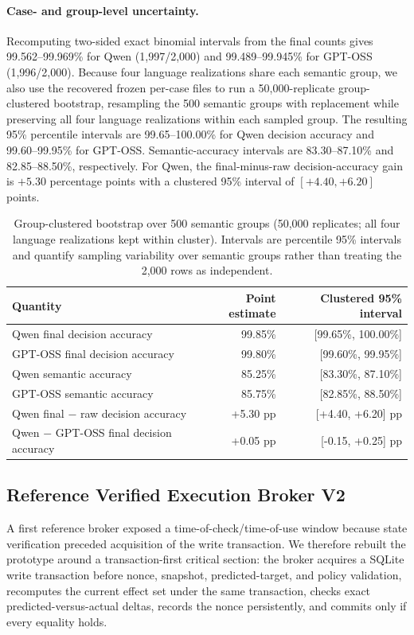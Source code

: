 \paragraph{Case- and group-level uncertainty.}
Recomputing two-sided exact binomial intervals from the final counts gives 99.562--99.969\% for Qwen (1,997/2,000) and 99.489--99.945\% for GPT-OSS (1,996/2,000). Because four language realizations share each semantic group, we also use the recovered frozen per-case files to run a 50,000-replicate group-clustered bootstrap, resampling the 500 semantic groups with replacement while preserving all four language realizations within each sampled group. The resulting 95\% percentile intervals are 99.65--100.00\% for Qwen decision accuracy and 99.60--99.95\% for GPT-OSS. Semantic-accuracy intervals are 83.30--87.10\% and 82.85--88.50\%, respectively. For Qwen, the final-minus-raw decision-accuracy gain is $+5.30$ percentage points with a clustered 95\% interval of $[+4.40,+6.20]$ points.

\begin{table}[t]
\centering
\caption{Group-clustered bootstrap over 500 semantic groups (50,000 replicates; all four language realizations kept within cluster). Intervals are percentile 95\% intervals and quantify sampling variability over semantic groups rather than treating the 2,000 rows as independent.}
\label{tab:cluster-bootstrap}
\begin{tabular}{lrr}
\toprule
Quantity & Point estimate & Clustered 95\% interval \\
\midrule
Qwen final decision accuracy & 99.85\% & [99.65\%, 100.00\%] \\
GPT-OSS final decision accuracy & 99.80\% & [99.60\%, 99.95\%] \\
Qwen semantic accuracy & 85.25\% & [83.30\%, 87.10\%] \\
GPT-OSS semantic accuracy & 85.75\% & [82.85\%, 88.50\%] \\
Qwen final $-$ raw decision accuracy & +5.30 pp & [+4.40, +6.20] pp \\
Qwen $-$ GPT-OSS final decision accuracy & +0.05 pp & [-0.15, +0.25] pp \\
\bottomrule
\end{tabular}
\end{table}

\subsection{Reference Verified Execution Broker V2}
A first reference broker exposed a time-of-check/time-of-use window because state verification preceded acquisition of the write transaction. We therefore rebuilt the prototype around a transaction-first critical section: the broker acquires a SQLite write transaction before nonce, snapshot, predicted-target, and policy validation, recomputes the current effect set under the same transaction, checks exact predicted-versus-actual deltas, records the nonce persistently, and commits only if every equality holds.


